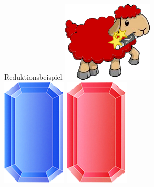 \documentclass[18pt]{beamer}
\begin{document}
\begin{frame}{Reduktionsbeispiel}
\includegraphics[scale=1,7]{Pictures/lamb_red_wm}
\\[0.3cm]
\includegraphics[scale=0.5]{Pictures/gem_blue}
\includegraphics[scale=0.5]{Pictures/gem_red}
	
	
\end{frame}
\end{document}
